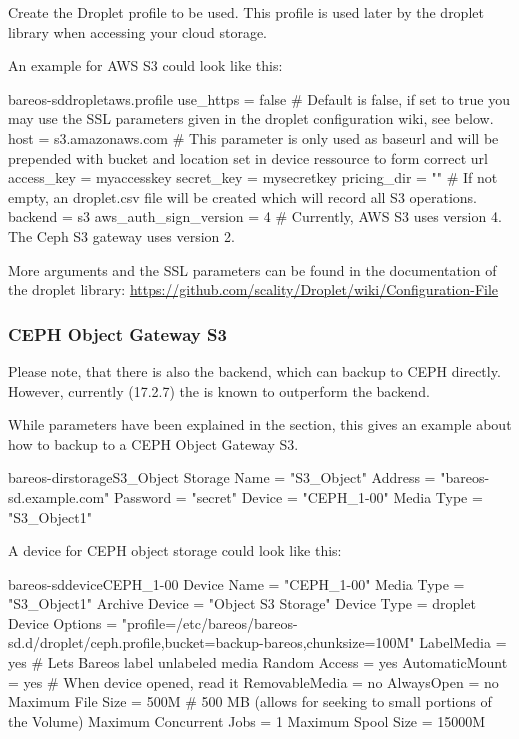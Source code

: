 Create the Droplet profile to be used.
This profile is used later by the droplet library when accessing your cloud storage.

An example for AWS S3 could look like this:

\begin{bareosConfigResource}{bareos-sd}{droplet}{aws.profile}
use_https = false               # Default is false, if set to true you may use the SSL parameters given in the droplet configuration wiki, see below.
host = s3.amazonaws.com         # This parameter is only used as baseurl and will be prepended with bucket and location set in device ressource to form correct url
access_key = myaccesskey
secret_key = mysecretkey
pricing_dir = ""                # If not empty, an droplet.csv file will be created which will record all S3 operations.
backend = s3
aws_auth_sign_version = 4       # Currently, AWS S3 uses version 4. The Ceph S3 gateway uses version 2.
\end{bareosConfigResource}


More arguments and the SSL parameters can be found in the documentation of the droplet library:
\url{https://github.com/scality/Droplet/wiki/Configuration-File}

\subsubsection{CEPH Object Gateway S3}

Please note, that there is also the  backend,
which can backup to CEPH directly. However, currently (17.2.7) the  is known to outperform the  backend.

While parameters have been explained in the  section, this gives an example about how to backup to a CEPH Object Gateway S3.

\begin{bareosConfigResource}{bareos-dir}{storage}{S3\_Object}
Storage {
    Name = "S3_Object"
    Address  = "bareos-sd.example.com"
    Password = "secret"
    Device = "CEPH_1-00"
    Media Type = "S3_Object1"
}
\end{bareosConfigResource}


A device for CEPH object storage could look like this:
\begin{bareosConfigResource}{bareos-sd}{device}{CEPH\_1-00}
Device {
  Name = "CEPH_1-00"
  Media Type = "S3_Object1"
  Archive Device = "Object S3 Storage"
  Device Type = droplet
  Device Options = "profile=/etc/bareos/bareos-sd.d/droplet/ceph.profile,bucket=backup-bareos,chunksize=100M"
  LabelMedia = yes                    # Lets Bareos label unlabeled media
  Random Access = yes
  AutomaticMount = yes                # When device opened, read it
  RemovableMedia = no
  AlwaysOpen = no
  Maximum File Size = 500M            # 500 MB (allows for seeking to small portions of the Volume)
  Maximum Concurrent Jobs = 1
  Maximum Spool Size = 15000M
}
\end{bareosConfigResource}


